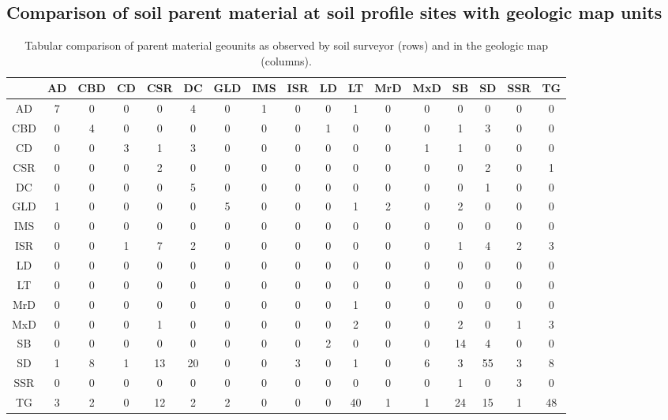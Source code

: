 \documentclass[preprint,12pt,authoryear]{elsarticle}
\begin{document}
\subsection{Comparison of soil parent material at soil profile sites with geologic map units}
\begin{table}[ht]
\centering
\tabcolsep=0.06cm
\begin{tabular}{ccccccccccccccccc}
  \hline
 & AD & CBD & CD & CSR & DC & GLD & IMS & ISR & LD & LT & MrD & MxD & SB & SD & SSR & TG \\ 
  \hline
AD &   7 &   0 &   0 &   0 &   4 &   0 &   1 &   0 &   0 &   1 &   0 &   0 &   0 &   0 &   0 &   0 \\ 
  CBD &   0 &   4 &   0 &   0 &   0 &   0 &   0 &   0 &   1 &   0 &   0 &   0 &   1 &   3 &   0 &   0 \\ 
  CD &   0 &   0 &   3 &   1 &   3 &   0 &   0 &   0 &   0 &   0 &   0 &   1 &   1 &   0 &   0 &   0 \\ 
  CSR &   0 &   0 &   0 &   2 &   0 &   0 &   0 &   0 &   0 &   0 &   0 &   0 &   0 &   2 &   0 &   1 \\ 
  DC &   0 &   0 &   0 &   0 &   5 &   0 &   0 &   0 &   0 &   0 &   0 &   0 &   0 &   1 &   0 &   0 \\ 
  GLD &   1 &   0 &   0 &   0 &   0 &   5 &   0 &   0 &   0 &   1 &   2 &   0 &   2 &   0 &   0 &   0 \\ 
  IMS &   0 &   0 &   0 &   0 &   0 &   0 &   0 &   0 &   0 &   0 &   0 &   0 &   0 &   0 &   0 &   0 \\ 
  ISR &   0 &   0 &   1 &   7 &   2 &   0 &   0 &   0 &   0 &   0 &   0 &   0 &   1 &   4 &   2 &   3 \\ 
  LD &   0 &   0 &   0 &   0 &   0 &   0 &   0 &   0 &   0 &   0 &   0 &   0 &   0 &   0 &   0 &   0 \\ 
  LT &   0 &   0 &   0 &   0 &   0 &   0 &   0 &   0 &   0 &   0 &   0 &   0 &   0 &   0 &   0 &   0 \\ 
  MrD &   0 &   0 &   0 &   0 &   0 &   0 &   0 &   0 &   0 &   1 &   0 &   0 &   0 &   0 &   0 &   0 \\ 
  MxD &   0 &   0 &   0 &   1 &   0 &   0 &   0 &   0 &   0 &   2 &   0 &   0 &   2 &   0 &   1 &   3 \\ 
  SB &   0 &   0 &   0 &   0 &   0 &   0 &   0 &   0 &   2 &   0 &   0 &   0 &  14 &   4 &   0 &   0 \\ 
  SD &   1 &   8 &   1 &  13 &  20 &   0 &   0 &   3 &   0 &   1 &   0 &   6 &   3 &  55 &   3 &   8 \\ 
  SSR &   0 &   0 &   0 &   0 &   0 &   0 &   0 &   0 &   0 &   0 &   0 &   0 &   1 &   0 &   3 &   0 \\ 
  TG &   3 &   2 &   0 &  12 &   2 &   2 &   0 &   0 &   0 &  40 &   1 &   1 &  24 &  15 &   1 &  48 \\ 
   \hline
\end{tabular}
\caption{Tabular comparison of parent material geounits as observed by soil surveyor (rows) and in the geologic map (columns).} 
\label{kartiergegenkarte}
\end{table}
\end{document}
